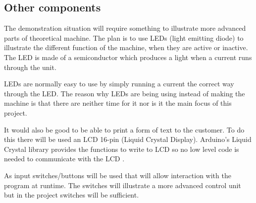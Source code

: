 \subsection{Other components}
The demonstration situation will require something to illustrate more advanced parts of theoretical machine. The plan is to use LEDs (light emitting diode) to illustrate the different function of the machine, when they are active or inactive. The LED is made of a semiconductor which produces a light when a current runs through the unit.

LEDs are normally easy to use by simply running a current the correct way through the LED.
The reason why LEDs are being using instead of making the machine is that there are neither time for it nor is it the main focus of this project.

It would also be good to be able to print a form of text to the customer. To do this there will be used an LCD 16-pin (Liquid Crystal Display). Arduino's Liquid Crystal library provides the functions to write to LCD so no low level code is needed to communicate with the LCD \citep{ArduinoLCD}.

As input switches/buttons will be used that will allow interaction with the program at runtime. The switches will illustrate a more advanced control unit but in the project switches will be sufficient.